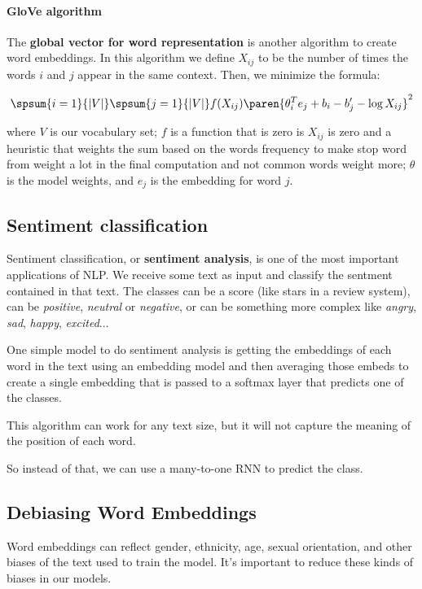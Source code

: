 \documentclass[12pt, a4paper, oneside]{book}
\begin{document}
\paragraph{GloVe algorithm}%
\label{par:glove_algorithm}

The \textbf{global vector for word representation} is another algorithm to
create word embeddings. In this algorithm we define $X_{ij}$ to be the number of
times the words $i$ and $j$ appear in the same context. Then, we minimize the
formula:

\[
\spsum{i=1}{|V|}\spsum{j=1}{|V|}f(X_{ij})\paren{\theta_i^{T}e_j+b_i-b_j'-\log
X_{ij}}^2
\]

where $V$ is our vocabulary set; $f$ is a function that is zero is $X_{ij}$ is
zero and a heuristic that weights the sum based on the words frequency to make
stop word from weight a lot in the final computation and not common words weight
more; $\theta$ is the model weights, and $e_j$ is the embedding for word $j$.

\subsection{Sentiment classification}%
\label{sub:sentiment_classification}

Sentiment classification, or \textbf{sentiment analysis}, is one of the most
important applications of NLP. We receive some text as input and classify the
sentment contained in that text. The classes can be a score (like stars in a
review system), can be \textit{positive}, \textit{neutral} or \textit{negative},
or can be something more complex like \textit{angry}, \textit{sad},
\textit{happy}, \textit{excited}...

One simple model to do sentiment analysis is getting the embeddings of each word
in the text using an embedding model and then averaging those embeds to create a
single embedding that is passed to a softmax layer that predicts one of the
classes.

This algorithm can work for any text size, but it will not capture the meaning
of the position of each word.

So instead of that, we can use a many-to-one RNN to predict the class.

\subsection{Debiasing Word Embeddings}%
\label{sub:debiasing_word_embeddings}

Word embeddings can reflect gender, ethnicity, age, sexual orientation, and
other biases of the text used to train the model. It's important to reduce these
kinds of biases in our models.
\end{document}
